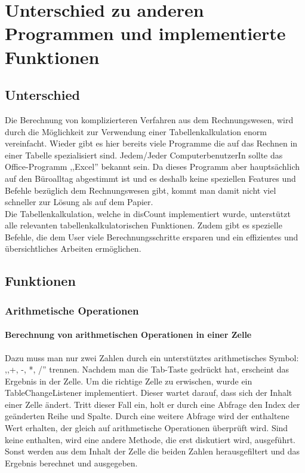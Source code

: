 \documentclass[12pt]{report}
\begin{document}
\chapter{Unterschied zu anderen Programmen und implementierte Funktionen}
 
\section{Unterschied}
Die Berechnung von komplizierteren Verfahren aus dem Rechnungswesen, wird durch die Möglichkeit zur Verwendung einer Tabellenkalkulation enorm vereinfacht. Wieder gibt es hier bereits viele Programme die auf das Rechnen in einer Tabelle spezialisiert sind. Jedem/Jeder ComputerbenutzerIn sollte das Office-Programm ,,Excel'' bekannt sein. Da dieses Programm aber hauptsächlich auf den Büroalltag abgestimmt ist und es deshalb keine speziellen Features und Befehle bezüglich dem Rechnungswesen gibt, kommt man damit nicht viel schneller zur Lösung als auf dem Papier.\\
Die Tabellenkalkulation, welche in disCount implementiert wurde, unterstützt alle relevanten tabellenkalkulatorischen Funktionen. Zudem gibt es spezielle Befehle, die dem User viele Berechnungsschritte ersparen und ein effizientes und übersichtliches Arbeiten ermöglichen.



\section{Funktionen}

\subsection{Arithmetische Operationen}



\subsubsection{Berechnung von arithmetischen Operationen in einer Zelle}
Dazu muss man nur zwei Zahlen durch ein unterstütztes arithmetisches Symbol: ,,+, -, *, /'' trennen. Nachdem man die Tab-Taste gedrückt hat, erscheint das Ergebnis in der Zelle. Um die richtige Zelle zu erwischen, wurde ein TableChangeListener implementiert. Dieser wartet darauf, dass sich der Inhalt einer Zelle ändert. Tritt dieser Fall ein, holt er durch eine Abfrage den Index der geänderten Reihe und Spalte. Durch eine weitere Abfrage wird der enthaltene Wert erhalten, der gleich auf arithmetische Operationen überprüft wird. Sind keine enthalten, wird eine andere Methode, die erst diskutiert wird, ausgeführt. Sonst werden aus dem Inhalt der Zelle die beiden Zahlen herausgefiltert und das Ergebnis berechnet und ausgegeben.
\end{document}
